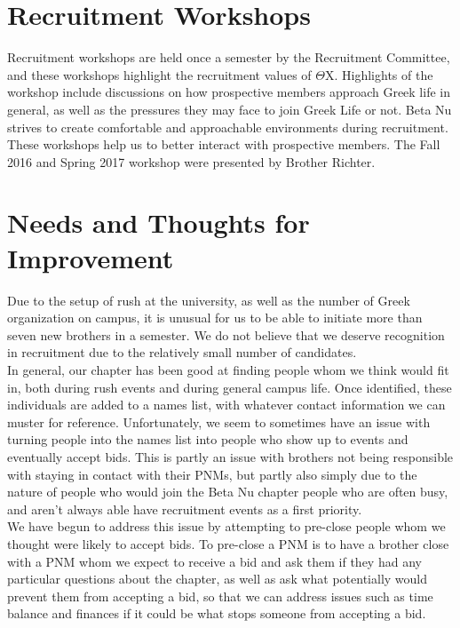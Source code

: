   \section*{Recruitment Workshops}
    Recruitment workshops are held once a semester by the Recruitment Committee, and these workshops highlight the recruitment values of $\Theta$X. Highlights of the workshop include discussions on how prospective members approach Greek life in general, as well as the pressures they may face to join Greek Life or not. Beta Nu strives to create comfortable and approachable environments during recruitment. These workshops help us to better interact with prospective members. The Fall 2016 and Spring 2017 workshop were presented by Brother Richter.

    
  \section*{Needs and Thoughts for Improvement}
    Due to the setup of rush at the university, as well as the number of Greek organization on campus, it is unusual for us to be able to initiate more than seven new brothers in a semester. We do not believe that we deserve recognition in recruitment due to the relatively small number of candidates.\\
    
    In general, our chapter has been good at finding people whom we think would fit in, both during rush events and during general campus life. Once identified, these individuals are added to a names list, with whatever contact information we can muster for reference. Unfortunately, we seem to sometimes have an issue with turning people into the names list into people who show up to events and eventually accept bids. This is partly an issue with brothers not being responsible with staying in contact with their PNMs, but partly also simply due to the nature of people who would join the Beta Nu chapter people who are often busy, and aren’t always able have recruitment events as a first priority. \\
    
    We have begun to address this issue by attempting to pre-close people whom we thought were likely to accept bids. To pre-close a PNM is to have a brother close with a PNM whom we expect to receive a bid and ask them if they had any particular questions about the chapter, as well as ask what potentially would prevent them from accepting a bid, so that we can address issues such as time balance and finances if it could be what stops someone from accepting a bid. \\
    
